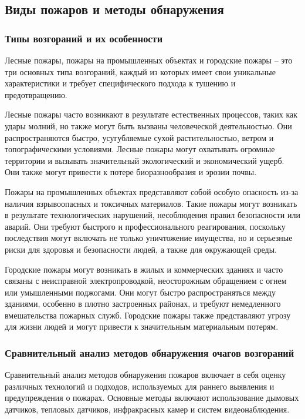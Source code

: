 \subsection{Виды пожаров и методы обнаружения}
\subsubsection{Типы возгораний и их особенности}
Лесные пожары, пожары на промышленных объектах и городские пожары – это три основных типа возгораний, каждый из которых имеет свои уникальные характеристики и требует специфического подхода к тушению и предотвращению.

Лесные пожары часто возникают в результате естественных процессов, таких как удары молний, но также могут быть вызваны человеческой деятельностью. Они распространяются быстро, усугубляемые сухой растительностью, ветром и топографическими условиями. Лесные пожары могут охватывать огромные территории и вызывать значительный экологический и экономический ущерб. Они также могут привести к потере биоразнообразия и эрозии почвы.

Пожары на промышленных объектах представляют собой особую опасность из-за наличия взрывоопасных и токсичных материалов. Такие пожары могут возникать в результате технологических нарушений, несоблюдения правил безопасности или аварий. Они требуют быстрого и профессионального реагирования, поскольку последствия могут включать не только уничтожение имущества, но и серьезные риски для здоровья и безопасности людей, а также для окружающей среды.

Городские пожары могут возникать в жилых и коммерческих зданиях и часто связаны с неисправной электропроводкой, неосторожным обращением с огнем или умышленными поджогами. Они могут быстро распространяться между зданиями, особенно в плотно застроенных районах, и требуют немедленного вмешательства пожарных служб. Городские пожары также представляют угрозу для жизни людей и могут привести к значительным материальным потерям.
\subsubsection{Сравнительный анализ методов обнаружения очагов возгораний}
Сравнительный анализ методов обнаружения пожаров включает в себя оценку различных технологий и подходов, используемых для раннего выявления и предупреждения о пожарах. Основные методы включают использование дымовых датчиков, тепловых датчиков, инфракрасных камер и систем видеонаблюдения.


